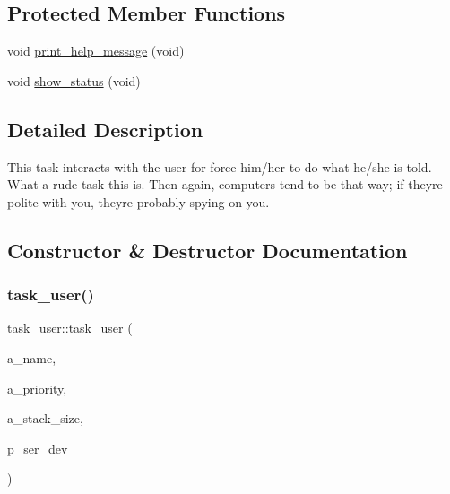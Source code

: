 \subsection*{Protected Member Functions}
\begin{DoxyCompactItemize}
\item 
void \mbox{\hyperlink{classtask__user_a75475060f83bae1e44bcc8a5c34015c7}{print\+\_\+help\+\_\+message}} (void)
\item 
void \mbox{\hyperlink{classtask__user_a105bebbd9cb1031154c3dfc3662db4a0}{show\+\_\+status}} (void)
\end{DoxyCompactItemize}


\subsection{Detailed Description}
This task interacts with the user for force him/her to do what he/she is told. What a rude task this is. Then again, computers tend to be that way; if they\textquotesingle{}re polite with you, they\textquotesingle{}re probably spying on you. 

\subsection{Constructor \& Destructor Documentation}
\mbox{\label{classtask__user_a3aba77563b375bb14838800608da48bc}} 
\subsubsection{\texorpdfstring{task\_user()}{task\_user()}}
{\footnotesize\ttfamily task\+\_\+user\+::task\+\_\+user (\begin{DoxyParamCaption}\item[{const char $\ast$}]{a\+\_\+name,  }\item[{unsigned port\+B\+A\+S\+E\+\_\+\+T\+Y\+PE}]{a\+\_\+priority,  }\item[{size\+\_\+t}]{a\+\_\+stack\+\_\+size,  }\item[{emstream $\ast$}]{p\+\_\+ser\+\_\+dev }\end{DoxyParamCaption})}

